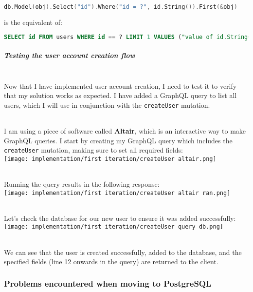 \documentclass[../../main.tex]{subfiles}
\begin{document}
\begin{lstlisting}[language=Go]
        db.Model(obj).Select("id").Where("id = ?", id.String()).First(&obj)
    \end{lstlisting}

\noindent is the equivalent of:

\begin{lstlisting}[language=SQL]
        SELECT id FROM users WHERE id == ? LIMIT 1 VALUES ("value of id.String()")
    \end{lstlisting}

\subparagraph{Testing the user account creation flow}

\noindent \\ Now that I have implemented user account creation, I need to test it to verify that my solution works as expected. I have added a GraphQL query to list all users, which I will use in conjunction with the \lstinline{createUser} mutation.

\noindent \\ I am using a piece of software called \textbf{Altair}, which is an interactive way to make GraphQL queries. I start by creating my GraphQL query which includes the \lstinline{createUser} mutation, making sure to set all required fields:\\

\texttt{[image: implementation/first iteration/createUser altair.png]}

\noindent \\ Running the query results in the following response:\\

\texttt{[image: implementation/first iteration/createUser altair ran.png]}

\noindent \\ Let's check the database for our new user to ensure it was added successfully:\\

\texttt{[image: implementation/first iteration/createUser query db.png]}

\noindent \\ We can see that the user is created successfully, added to the database, and the specified fields (line 12 onwards in the query) are returned to the client.

\subsubsection{Problems encountered when moving to PostgreSQL}
\end{document}

